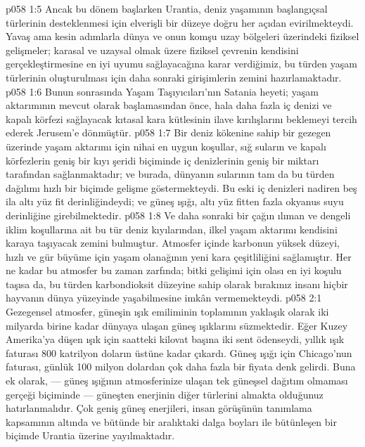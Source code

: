 \vs p058 1:5 Ancak bu dönem başlarken Urantia, deniz yaşamının başlangıçsal türlerinin desteklenmesi için elverişli bir düzeye doğru her açıdan evirilmekteydi. Yavaş ama kesin adımlarla dünya ve onun komşu uzay bölgeleri üzerindeki fiziksel gelişmeler; karasal ve uzaysal olmak üzere fiziksel çevrenin kendisini gerçekleştirmesine en iyi uyumu sağlayacağına karar verdiğimiz, bu türden yaşam türlerinin oluşturulması için daha sonraki girişimlerin zemini hazırlamaktadır.
\vs p058 1:6 Bunun sonrasında Yaşam Taşıyıcıları’nın Satania heyeti; yaşam aktarımının mevcut olarak başlamasından önce, hala daha fazla iç denizi ve kapalı körfezi sağlayacak kıtasal kara kütlesinin ilave kırılışlarını beklemeyi tercih ederek Jerusem’e dönmüştür.
\vs p058 1:7 Bir deniz kökenine sahip bir gezegen üzerinde yaşam aktarımı için nihai en uygun koşullar, sığ suların ve kapalı körfezlerin geniş bir kıyı şeridi biçiminde iç denizlerinin geniş bir miktarı tarafından sağlanmaktadır; ve burada, dünyanın sularının tam da bu türden dağılımı hızlı bir biçimde gelişme göstermekteydi. Bu eski iç denizleri nadiren beş ila altı yüz fit derinliğindeydi; ve güneş ışığı, altı yüz fitten fazla okyanus suyu derinliğine girebilmektedir.
\vs p058 1:8 Ve daha sonraki bir çağın ılıman ve dengeli iklim koşullarına ait bu tür deniz kıyılarından, ilkel yaşam aktarımı kendisini karaya taşıyacak zemini bulmuştur. Atmosfer içinde karbonun yüksek düzeyi, hızlı ve gür büyüme için yaşam olanağının yeni kara çeşitliliğini sağlamıştır. Her ne kadar bu atmosfer bu zaman zarfında; bitki gelişimi için olası en iyi koşulu taşısa da, bu türden karbondioksit düzeyine sahip olarak bırakınız insanı hiçbir hayvanın dünya yüzeyinde yaşabilmesine imkân vermemekteydi.
\vs p058 2:1 Gezegensel atmosfer, güneşin ışık emiliminin toplamının yaklaşık olarak iki milyarda birine kadar dünyaya ulaşan güneş ışıklarını süzmektedir. Eğer Kuzey Amerika’ya düşen ışık için saatteki kilovat başına iki sent ödenseydi, yıllık ışık faturası 800 katrilyon doların üstüne kadar çıkardı. Güneş ışığı için Chicago’nun faturası, günlük 100 milyon dolardan çok daha fazla bir fiyata denk gelirdi. Buna ek olarak, --- güneş ışığının atmosferinize ulaşan tek güneşsel dağıtım olmaması gerçeği biçiminde --- güneşten enerjinin diğer türlerini almakta olduğunuz hatırlanmalıdır. Çok geniş güneş enerjileri, insan görüşünün tanımlama kapsamının altında ve bütünde bir aralıktaki dalga boyları ile bütünleşen bir biçimde Urantia üzerine yayılmaktadır.

